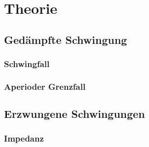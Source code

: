 \section{Theorie}
\label{sec:Theorie}

\subsection{Gedämpfte Schwingung}

\subsubsection{Schwingfall}

\subsubsection{Aperioder Grenzfall}

\subsection{Erzwungene Schwingungen}

\subsubsection{Impedanz}
